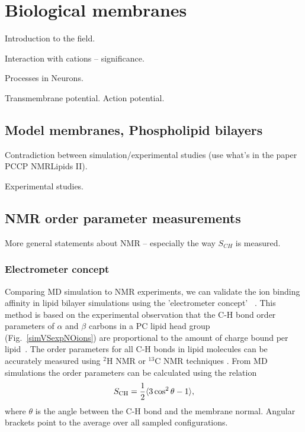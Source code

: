 \chapter{Biological membranes}

 Introduction to the field. 

 Interaction with cations -- significance. 

 Processes in Neurons. 

 Transmembrane potential. Action potential. 

\section{Model membranes, Phospholipid bilayers }

 Contradiction between simulation/experimental studies 
(use what's in the paper PCCP NMRLipids II). 

Experimental studies. 


\section{NMR order parameter measurements}
 
  More general statements about NMR  -- especially the way $S_{CH}$ is measured. 

\subsection{Electrometer concept} \label{section:electrometer} 

Comparing MD simulation to NMR experiments, we can validate the ion 
binding affinity in lipid bilayer simulations using the 'electrometer concept'~ \citep{seelig87, catte16}. 
This method is based on the experimental observation that the C-H bond order parameters of $\alpha$ and $\beta$ carbons in a PC lipid head group (Fig.~\ref{simVSexpNOions}) are proportional to the amount of charge bound per lipid~\citep{seelig87}. 
The order parameters for all C-H bonds in lipid molecules can be accurately measured using $^2$H NMR or $^{13}$C NMR techniques \citep{ollila16}. 
From MD simulations the order parameters can be calculated using the relation 
\begin{equation}\label{OP} 
S_{\rm CH}=\frac{1}{2}\langle 3\cos^2\theta -1 \rangle, 
\end{equation} 
where $\theta$ is the angle between the C-H bond and the membrane normal. 
Angular brackets point to the average over all sampled configurations. 
 
